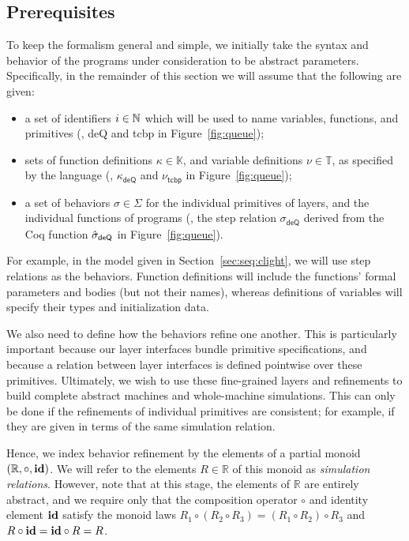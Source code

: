 \subsection{Prerequisites}

To keep the formalism general and simple,
we initially take the syntax and behavior of the programs
under consideration to be abstract parameters.
Specifically,
in the remainder of this section we will assume that
the following are given:
\begin{itemize}
\item a set of identifiers $i \in \mathbb{N}$
    which will be used to name variables, functions, and primitives
    (\eg, \textsf{deQ} and \textsf{tcbp} in Figure~\ref{fig:queue});
\item sets of function definitions $\kappa \in \mathbb{K}$, and
    variable definitions $\nu \in \mathbb{T}$,
    as specified by the language
    (\eg, $\kappa_\textsf{deQ}$ and $\nu_\textsf{tcbp}$ in Figure~\ref{fig:queue});
\item a set of behaviors $\sigma \in \Sigma$
    for the individual primitives of layers,
    and the individual functions of programs
    (\eg, the step relation $\sigma_\textsf{deQ}$ 
    	derived from the Coq function 
    	$\hat{\sigma}_\textsf{deQ}$ in Figure~\ref{fig:queue}).
\end{itemize}
For example, in the model given in Section~\ref{sec:seq:clight},
we will use step relations as the behaviors.
Function definitions will include the functions' formal parameters and bodies
(but not their names),
whereas definitions of variables
will specify their types and initialization data.

We also need to define how the behaviors
refine one another.
This is particularly important because
our layer interfaces bundle primitive specifications,
and because a relation between layer interfaces is defined pointwise
over these primitives. Ultimately, we wish to use these
fine-grained layers and refinements to build complete abstract
machines and whole-machine simulations. 
This can only be done
if the refinements of individual primitives are consistent;
for example, if they are given in terms of the same simulation relation.

Hence, we index behavior refinement by
the elements of a partial monoid $(\mathbb{R}, \circ, \textbf{id})$.
We will refer to the elements $R \in \mathbb{R}$ of this monoid
as \emph{simulation relations}.
However, note that at this stage,
the elements of $\mathbb{R}$ are entirely abstract,
and we require only that the composition operator $\circ$
and identity element $\textbf{id}$ satisfy the monoid laws
$R_1 \circ (R_2 \circ R_3) = (R_1 \circ R_2) \circ R_3$ and
$R \circ \textbf{id} = \textbf{id} \circ R = R$.

